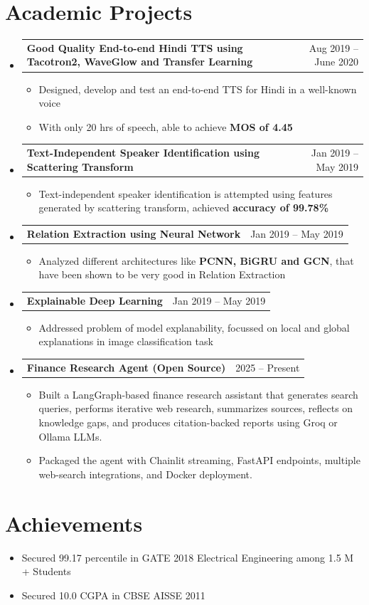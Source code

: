 \documentclass[letterpaper,11pt]{article}
\makeatletter
\newcommand{\resumeItem}[1]{
  \item\small{
    {#1 \vspace{-2pt}}
  }
}
\newcommand{\resumeProjectHeading}[2]{
    \item
    \begin{tabular*}{0.97\textwidth}{l@{\extracolsep{\fill}}r}
      \small#1 & #2 \\
    \end{tabular*}\vspace{-7pt}
}
\newcommand{\resumeProjectItem}[1]{
  \item\footnotesize{
    {#1 \vspace{-2pt}}
  }
}
\newcommand{\resumeSubHeadingListStart}{\begin{itemize}[leftmargin=0.15in, label={}]}
\newcommand{\resumeSubHeadingListEnd}{\end{itemize}}
\newcommand{\resumeProjectListStart}{\begin{itemize}[leftmargin=0.3in]}
\newcommand{\resumeProjectListEnd}{\end{itemize}\vspace{-3pt}}
\makeatother
\begin{document}
\section{\textbf{Academic Projects}}
    \resumeSubHeadingListStart
      \resumeProjectHeading
          {\textbf{Good Quality End-to-end Hindi TTS using Tacotron2, WaveGlow and Transfer Learning}}{Aug 2019 -- June 2020}
          \resumeProjectListStart
            \resumeProjectItem{Designed, develop and test an end-to-end TTS for Hindi in a well-known voice}
            \resumeProjectItem{With only 20 hrs of speech, able to achieve \textbf{MOS of 4.45}}
          \resumeProjectListEnd
      \resumeProjectHeading
          {\textbf{Text-Independent Speaker Identification using Scattering Transform}}{Jan 2019 -- May 2019}
          \resumeProjectListStart
            \resumeProjectItem{Text-independent speaker identification is attempted using features generated by scattering transform, achieved \textbf{accuracy of 99.78\%}}
          \resumeProjectListEnd
      \resumeProjectHeading
          {\textbf{Relation Extraction using Neural Network}}{Jan 2019 -- May 2019}
          \resumeProjectListStart
            \resumeProjectItem{Analyzed different architectures like \textbf{PCNN, BiGRU and GCN}, that have been shown to be very good in Relation Extraction}
          \resumeProjectListEnd
      \resumeProjectHeading
          {\textbf{Explainable Deep Learning}}{Jan 2019 -- May 2019}
          \resumeProjectListStart
            \resumeProjectItem{Addressed problem of model explanability, focussed on local and global explanations in image classification task}
          \resumeProjectListEnd
      \resumeProjectHeading
          {\textbf{Finance Research Agent (Open Source)}}{2025 -- Present}
          \resumeProjectListStart
            \resumeProjectItem{Built a LangGraph-based finance research assistant that generates search queries, performs iterative web research, summarizes sources, reflects on knowledge gaps, and produces citation-backed reports using Groq or Ollama LLMs.}
            \resumeProjectItem{Packaged the agent with Chainlit streaming, FastAPI endpoints, multiple web-search integrations, and Docker deployment.}
          \resumeProjectListEnd
    \resumeSubHeadingListEnd

\section{Achievements}
\resumeSubHeadingListStart
    \resumeItem{Secured 99.17 percentile in GATE 2018 Electrical Engineering among 1.5 M + Students}
    \resumeItem{Secured 10.0 CGPA in CBSE AISSE 2011}
\resumeSubHeadingListEnd
\end{document}
